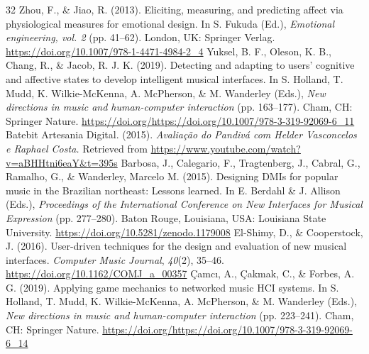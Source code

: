 \documentclass[sigconf]{nimeart}
\begin{document}
\begin{thebibliography}{32}
 {{ }}  Zhou, F., \& Jiao, R. (2013). Eliciting, measuring, and predicting affect via physiological measures for emotional design. In S. Fukuda (Ed.), \emph{Emotional engineering, vol. 2} (pp. 41--62). London, UK: Springer Verlag. \url{https://doi.org/10.1007/978-1-4471-4984-2_4}{}
 {{ }}  Yuksel, B. F., Oleson, K. B., Chang, R., \& Jacob, R. J. K. (2019). Detecting and adapting to users' cognitive and affective states to develop intelligent musical interfaces. In S. Holland, T. Mudd, K. Wilkie-McKenna, A. McPherson, \& M. Wanderley (Eds.), \emph{New directions in music and human-computer interaction} (pp. 163--177). Cham, CH: Springer Nature. \url{https://doi.org/https://doi.org/10.1007/978-3-319-92069-6_11}{}
 {{ }}  Batebit Artesania Digital. (2015). \emph{Avaliação do Pandivá com Helder Vasconcelos e Raphael Costa.} Retrieved from \url{https://www.youtube.com/watch?v=aBHHtni6eaY&t=395s}{}
 {{ }}  Barbosa, J., Calegario, F., Tragtenberg, J., Cabral, G., Ramalho, G., \& Wanderley, Marcelo M. (2015). Designing DMIs for popular music in the Brazilian northeast: Lessons learned. In E. Berdahl \& J. Allison (Eds.), \emph{Proceedings of the International Conference on New Interfaces for Musical Expression} (pp. 277--280). Baton Rouge, Louisiana, USA: Louisiana State University. \url{https://doi.org/10.5281/zenodo.1179008}{}
 {{ }}  El-Shimy, D., \& Cooperstock, J. (2016). User-driven techniques for the design and evaluation of new musical interfaces. \emph{Computer Music Journal}, \emph{40}(2), 35--46. \url{https://doi.org/10.1162/COMJ_a_00357}{}
 {{ }}  Çamcı, A., Çakmak, C., \& Forbes, A. G. (2019). Applying game mechanics to networked music HCI systems. In S. Holland, T. Mudd, K. Wilkie-McKenna, A. McPherson, \& M. Wanderley (Eds.), \emph{New directions in music and human-computer interaction} (pp. 223--241). Cham, CH: Springer Nature. \url{https://doi.org/https://doi.org/10.1007/978-3-319-92069-6_14}{}
\end{thebibliography}
\end{document}
